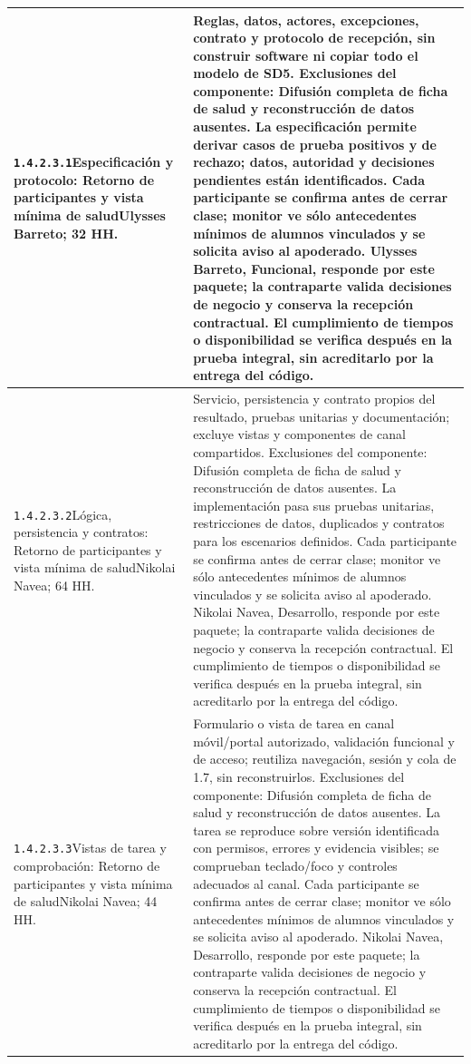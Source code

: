 \begin{longtable}{L{52mm}L{91mm}}
\texttt{1.\allowbreak{}4.\allowbreak{}2.\allowbreak{}3.\allowbreak{}1}\newline Especificación y protocolo: Retorno de participantes y vista mínima de salud\newline Ulysses Barreto; 32 HH. & Reglas, datos, actores, excepciones, contrato y protocolo de recepción, sin construir software ni copiar todo el modelo de SD5. Exclusiones del componente: Difusión completa de ficha de salud y reconstrucción de datos ausentes. La especificación permite derivar casos de prueba positivos y de rechazo; datos, autoridad y decisiones pendientes están identificados. Cada participante se confirma antes de cerrar clase; monitor ve sólo antecedentes mínimos de alumnos vinculados y se solicita aviso al apoderado. Ulysses Barreto, Funcional, responde por este paquete; la contraparte valida decisiones de negocio y conserva la recepción contractual. El cumplimiento de tiempos o disponibilidad se verifica después en la prueba integral, sin acreditarlo por la entrega del código.\\\hline
\texttt{1.\allowbreak{}4.\allowbreak{}2.\allowbreak{}3.\allowbreak{}2}\newline Lógica, persistencia y contratos: Retorno de participantes y vista mínima de salud\newline Nikolai Navea; 64 HH. & Servicio, persistencia y contrato propios del resultado, pruebas unitarias y documentación; excluye vistas y componentes de canal compartidos. Exclusiones del componente: Difusión completa de ficha de salud y reconstrucción de datos ausentes. La implementación pasa sus pruebas unitarias, restricciones de datos, duplicados y contratos para los escenarios definidos. Cada participante se confirma antes de cerrar clase; monitor ve sólo antecedentes mínimos de alumnos vinculados y se solicita aviso al apoderado. Nikolai Navea, Desarrollo, responde por este paquete; la contraparte valida decisiones de negocio y conserva la recepción contractual. El cumplimiento de tiempos o disponibilidad se verifica después en la prueba integral, sin acreditarlo por la entrega del código.\\\hline
\texttt{1.\allowbreak{}4.\allowbreak{}2.\allowbreak{}3.\allowbreak{}3}\newline Vistas de tarea y comprobación: Retorno de participantes y vista mínima de salud\newline Nikolai Navea; 44 HH. & Formulario o vista de tarea en canal móvil/portal autorizado, validación funcional y de acceso; reutiliza navegación, sesión y cola de 1.7, sin reconstruirlos. Exclusiones del componente: Difusión completa de ficha de salud y reconstrucción de datos ausentes. La tarea se reproduce sobre versión identificada con permisos, errores y evidencia visibles; se comprueban teclado/foco y controles adecuados al canal. Cada participante se confirma antes de cerrar clase; monitor ve sólo antecedentes mínimos de alumnos vinculados y se solicita aviso al apoderado. Nikolai Navea, Desarrollo, responde por este paquete; la contraparte valida decisiones de negocio y conserva la recepción contractual. El cumplimiento de tiempos o disponibilidad se verifica después en la prueba integral, sin acreditarlo por la entrega del código.\\\hline

\end{longtable}
